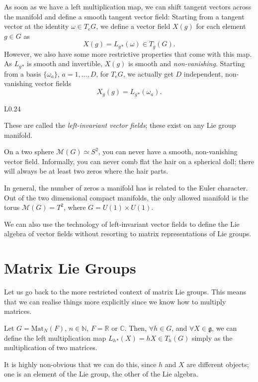 As soon as we have a left multiplication map, we can shift tangent vectors across the manifold and define a smooth tangent vector field:
Starting from a tangent vector at the identity $\omega \in T_e G$, we define a vector field $X(g)$ for each element $g \in G$ as
\begin{equation}
  X(g) = L_g{}_*(\omega) \in T_g(G).
\end{equation}
However, we also have some more restrictive properties that come with this map. As $L_g{}_*$ is smooth and invertible, $X(g)$ is smooth and \emph{non-vanishing}.
Starting from a basis $\{\omega_a\}$, $a = 1, \dots, D$, for $T_eG$, we actually get $D$ independent, non-vanishing vector fields
\begin{equation}
  X_g(g) = L_g{}_* (\omega_a).
\end{equation}

\begin{wrapfigure}{L}{0.24\columnwidth}
  \centering
  \def\svgwidth{0.2\columnwidth}
  
  \label{fig:hairyball}
\end{wrapfigure}

These are called the \emph{left-invariant vector fields}; these exist on any Lie group manifold.

\begin{example}
  On a two sphere $\mathcal{M}(G) \simeq S^2$, you can never have a smooth, non-vanishing vector field.
  Informally, you can never comb flat the hair on a spherical doll; there will always be at least two zeros where the hair parts.
\end{example}
In general, the number of zeros a manifold has is related to the Euler character.
Out of the two dimensional compact manifolds, the only allowed manifold is the torus $\mathcal{M}(G) = T^2$, where $G = U(1) \times U(1)$.

We can also use the technology of left-invariant vector fields to define the Lie algebra of vector fields without resorting to matrix representations of Lie groups.

\section{Matrix Lie Groups}%
\label{sec:matrix_lie_groups-again}

Let us go back to the more restricted context of matrix Lie groups. This means that we can realise things more explicitly since we know how to multiply matrices.
\begin{claim}
  Let $G = \text{Mat}_N(F)$, $n \in \mathbb{N}$, $F = \mathbb{R} \text{ or } \mathbb{C}$.
  Then, $\forall h \in G$, and $\forall X \in \mathfrak{g}$, we can define the left multiplication map $L_h{}_*(X) = h X \in T_h(G)$ simply as the multiplication of two matrices.
\end{claim}
\begin{leftbar}
  \begin{remark}
    It is highly non-obvious that we can do this, since $h$ and $X$ are different objects; one is an element of the Lie group, the other of the Lie algebra.
  \end{remark}
\end{leftbar}

